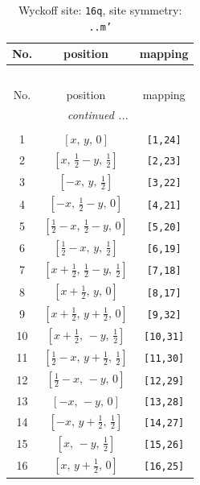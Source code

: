\documentclass[fleqn,8pt]{jsarticle}
\begin{document}
\renewcommand{\arraystretch}{1.2}
\begin{longtable}{ccc}
\caption{Wyckoff site: {\tt 16q}, site symmetry: {\tt ..m'}}
 \\
 \hline \hline
No. & position & mapping \\ \hline \endfirsthead

\multicolumn{2}{l}{\tablename\ \thetable{}} \\
 \hline \hline
No. & position & mapping \\ \hline \endhead

 \hline \hline
\multicolumn{2}{r}{\footnotesize\it continued ...} \\ \endfoot

 \hline \hline
\multicolumn{2}{r}{} \\ \endlastfoot

1 & $\left[ x,\, y,\, 0 \right]$ & {\tt [1,24]} \\ \hline
2 & $\left[ x,\, \frac{1}{2} - y,\, \frac{1}{2} \right]$ & {\tt [2,23]} \\ \hline
3 & $\left[ - x,\, y,\, \frac{1}{2} \right]$ & {\tt [3,22]} \\ \hline
4 & $\left[ - x,\, \frac{1}{2} - y,\, 0 \right]$ & {\tt [4,21]} \\ \hline
5 & $\left[ \frac{1}{2} - x,\, \frac{1}{2} - y,\, 0 \right]$ & {\tt [5,20]} \\ \hline
6 & $\left[ \frac{1}{2} - x,\, y,\, \frac{1}{2} \right]$ & {\tt [6,19]} \\ \hline
7 & $\left[ x + \frac{1}{2},\, \frac{1}{2} - y,\, \frac{1}{2} \right]$ & {\tt [7,18]} \\ \hline
8 & $\left[ x + \frac{1}{2},\, y,\, 0 \right]$ & {\tt [8,17]} \\ \hline
9 & $\left[ x + \frac{1}{2},\, y + \frac{1}{2},\, 0 \right]$ & {\tt [9,32]} \\ \hline
10 & $\left[ x + \frac{1}{2},\, - y,\, \frac{1}{2} \right]$ & {\tt [10,31]} \\ \hline
11 & $\left[ \frac{1}{2} - x,\, y + \frac{1}{2},\, \frac{1}{2} \right]$ & {\tt [11,30]} \\ \hline
12 & $\left[ \frac{1}{2} - x,\, - y,\, 0 \right]$ & {\tt [12,29]} \\ \hline
13 & $\left[ - x,\, - y,\, 0 \right]$ & {\tt [13,28]} \\ \hline
14 & $\left[ - x,\, y + \frac{1}{2},\, \frac{1}{2} \right]$ & {\tt [14,27]} \\ \hline
15 & $\left[ x,\, - y,\, \frac{1}{2} \right]$ & {\tt [15,26]} \\ \hline
16 & $\left[ x,\, y + \frac{1}{2},\, 0 \right]$ & {\tt [16,25]} \\
\end{longtable}
\end{document}
